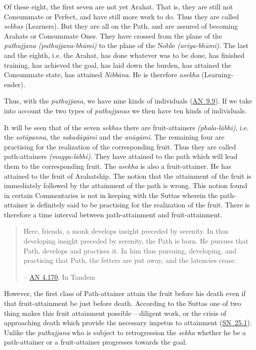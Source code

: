 Of these eight, the first seven are not yet Arahat. That is, they are still not Consummate or Perfect, and have still more work to do. Thus they are called \emph{sekhas} (Learners). But they are all on the Path, and are assured of becoming Arahats or Consummate Ones. They have crossed from the plane of the \emph{puthujjana} \emph{(puthujjana-bhūmi)} to the plane of the Noble \emph{(ariya-bhūmi)}. The last and the eighth, i.e. the Arahat, has done whatever was to be done, has finished training, has achieved the goal, has laid down the burden, has attained the Consummate state, has attained \emph{Nibbāna}. He is therefore \emph{asekha} (Learning-ender).

Thus, with the \emph{puthujjana}, we have nine kinds of individuals (\href{https://suttacentral.net/an9.9/en/sujato}{AN~9.9}). If we take into account the two types of \emph{puthujjanas} we then have ten kinds of individuals.

It will be seen that of the seven \emph{sekhas} there are fruit-attainers \emph{(phala-lābhi)}, i.e. the \emph{sotāpanna}, the \emph{sakadāgāmi} and the \emph{anāgāmi}. The remaining four are practising for the realization of the corresponding fruit. Thus they are called path-attainers \emph{(magga-lābhi)}. They have attained to the path which will lead them to the corresponding fruit. The \emph{asekha} is also a fruit-attainer. He has attained to the fruit of Arahatship. The notion that the attainment of the fruit is immediately followed by the attainment of the path is wrong. This notion found in certain Commentaries is not in keeping with the Suttas wherein the path-attainer is definitely said to be practising for the realization of the fruit. There is therefore a time interval between path-attainment and fruit-attainment.

\begin{quote}
Here, friends, a monk develops insight preceded by serenity. In thus developing insight preceded by serenity, the Path is born. He pursues that Path, develops and practises it. In him thus pursuing, developing, and practising that Path, the fetters are put away, and the latencies cease.

 -- \href{https://suttacentral.net/an4.170/en/thanissaro}{AN 4.170}, In Tandem
\end{quote}

However, the first class of Path-attainer  attain the fruit before his death even if that fruit-attainment be just before death. According to the Suttas one of two thing makes this fruit attainment possible -- diligent work, or the crisis of approaching death which provide the necessary impetus to attainment (\href{https://suttacentral.net/sn25.1/en/sujato}{SN~25.1}). Unlike the \emph{puthujjana} who is subject to retrogression the \emph{sekha} whether he be a path-attainer or a fruit-attainer progresses towards the goal.

